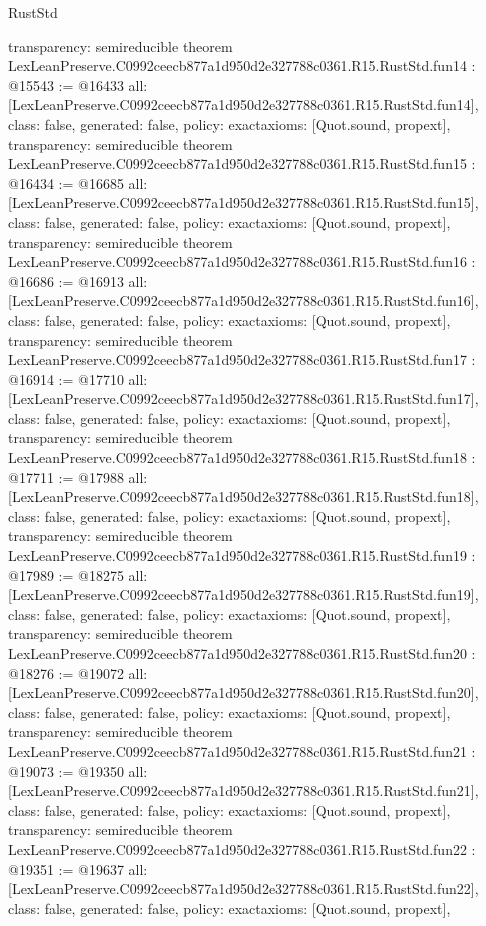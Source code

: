 \begin{lexlean}{RustStd}
\begin{coremodule}
{  transparency: semireducible
}
theorem LexLeanPreserve.C0992ceecb877a1d950d2e327788c0361.R15.RustStd.fun14 : @15543 := @16433 {
  all: [LexLeanPreserve.C0992ceecb877a1d950d2e327788c0361.R15.RustStd.fun14],
  class: false,
  generated: false,
  policy: exact{axioms: [Quot.sound, propext]},
  transparency: semireducible
}
theorem LexLeanPreserve.C0992ceecb877a1d950d2e327788c0361.R15.RustStd.fun15 : @16434 := @16685 {
  all: [LexLeanPreserve.C0992ceecb877a1d950d2e327788c0361.R15.RustStd.fun15],
  class: false,
  generated: false,
  policy: exact{axioms: [Quot.sound, propext]},
  transparency: semireducible
}
theorem LexLeanPreserve.C0992ceecb877a1d950d2e327788c0361.R15.RustStd.fun16 : @16686 := @16913 {
  all: [LexLeanPreserve.C0992ceecb877a1d950d2e327788c0361.R15.RustStd.fun16],
  class: false,
  generated: false,
  policy: exact{axioms: [Quot.sound, propext]},
  transparency: semireducible
}
theorem LexLeanPreserve.C0992ceecb877a1d950d2e327788c0361.R15.RustStd.fun17 : @16914 := @17710 {
  all: [LexLeanPreserve.C0992ceecb877a1d950d2e327788c0361.R15.RustStd.fun17],
  class: false,
  generated: false,
  policy: exact{axioms: [Quot.sound, propext]},
  transparency: semireducible
}
theorem LexLeanPreserve.C0992ceecb877a1d950d2e327788c0361.R15.RustStd.fun18 : @17711 := @17988 {
  all: [LexLeanPreserve.C0992ceecb877a1d950d2e327788c0361.R15.RustStd.fun18],
  class: false,
  generated: false,
  policy: exact{axioms: [Quot.sound, propext]},
  transparency: semireducible
}
theorem LexLeanPreserve.C0992ceecb877a1d950d2e327788c0361.R15.RustStd.fun19 : @17989 := @18275 {
  all: [LexLeanPreserve.C0992ceecb877a1d950d2e327788c0361.R15.RustStd.fun19],
  class: false,
  generated: false,
  policy: exact{axioms: [Quot.sound, propext]},
  transparency: semireducible
}
theorem LexLeanPreserve.C0992ceecb877a1d950d2e327788c0361.R15.RustStd.fun20 : @18276 := @19072 {
  all: [LexLeanPreserve.C0992ceecb877a1d950d2e327788c0361.R15.RustStd.fun20],
  class: false,
  generated: false,
  policy: exact{axioms: [Quot.sound, propext]},
  transparency: semireducible
}
theorem LexLeanPreserve.C0992ceecb877a1d950d2e327788c0361.R15.RustStd.fun21 : @19073 := @19350 {
  all: [LexLeanPreserve.C0992ceecb877a1d950d2e327788c0361.R15.RustStd.fun21],
  class: false,
  generated: false,
  policy: exact{axioms: [Quot.sound, propext]},
  transparency: semireducible
}
theorem LexLeanPreserve.C0992ceecb877a1d950d2e327788c0361.R15.RustStd.fun22 : @19351 := @19637 {
  all: [LexLeanPreserve.C0992ceecb877a1d950d2e327788c0361.R15.RustStd.fun22],
  class: false,
  generated: false,
  policy: exact{axioms: [Quot.sound, propext]},
}
\end{coremodule}
\end{lexlean}

